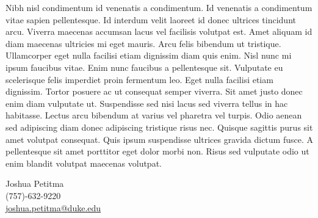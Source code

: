 \documentclass[11pt,a4]{article}
\begin{document}
Nibh nisl condimentum id venenatis a condimentum. Id venenatis a condimentum vitae sapien pellentesque. Id interdum velit laoreet id donec ultrices tincidunt arcu. Viverra maecenas accumsan lacus vel facilisis volutpat est. Amet aliquam id diam maecenas ultricies mi eget mauris. Arcu felis bibendum ut tristique. Ullamcorper eget nulla facilisi etiam dignissim diam quis enim. Nisl nunc mi ipsum faucibus vitae. Enim nunc faucibus a pellentesque sit. Vulputate eu scelerisque felis imperdiet proin fermentum leo. Eget nulla facilisi etiam dignissim. Tortor posuere ac ut consequat semper viverra. Sit amet justo donec enim diam vulputate ut. Suspendisse sed nisi lacus sed viverra tellus in hac habitasse. Lectus arcu bibendum at varius vel pharetra vel turpis. Odio aenean sed adipiscing diam donec adipiscing tristique risus nec. Quisque sagittis purus sit amet volutpat consequat. Quis ipsum suspendisse ultrices gravida dictum fusce. A pellentesque sit amet porttitor eget dolor morbi non. Risus sed vulputate odio ut enim blandit volutpat maecenas volutpat. \par


\vspace{0.5cm}
\raggedright
 Joshua Petitma \\ (757)-632-9220 \\
 \href{mailto:joshua.petitma@duke.edu}{joshua.petitma@duke.edu}
\end{document}
